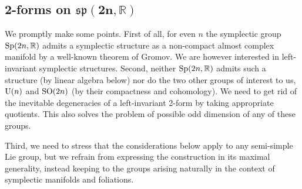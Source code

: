 \documentclass[pdftex]{sigma}
\numberwithin{equation}{section}
\begin{document}
\subsection[2-forms on $\mathfrak{sp}(2n,\mathbb{R})$]{2-forms on $\boldsymbol{\mathfrak{sp}(2n,\mathbb{R})}$}

We promptly make some points. First of all, for even $n$ the symplectic group ${\rm Sp}(2n,\mathbb{R})$ admits a symplectic structure as a non-compact almost complex manifold by a well-known theorem of Gromov. We are however interested in left-invariant symplectic structures. Second, neither ${\rm Sp}(2n,\mathbb{R})$ admits such a structure (by linear algebra below) nor do the two other groups of interest to us, ${\rm U}(n)$ and ${\rm SO}(2n)$ (by their compactness and cohomology). We need to get rid of the inevitable degeneracies of a left-invariant 2-form by taking appropriate quotients. This also solves the problem of possible odd dimension of any of these groups.

Third, we need to stress that the considerations below apply to any semi-simple Lie group, but we refrain from expressing the construction in its maximal generality, instead keeping to the groups arising naturally in the context of symplectic manifolds and foliations.
\end{document}
